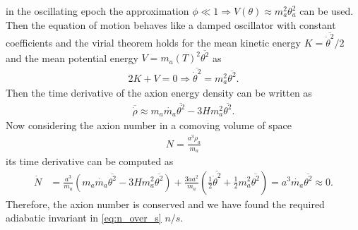 \documentclass[twoside,a4paper, 12pt]{article}
\numberwithin{equation}{section}
\begin{document}
in the oscillating epoch the approximation $\phi \ll 1 \Rightarrow V(\theta) \approx m_a^2 \theta_a^2$ can be used.
Then the equation of motion behaves like a damped oscillator with constant coefficients and the
virial theorem holds for the mean kinetic energy $K = \overline{\dot{\theta}^2} / 2$ and the mean potential energy $V = m_a(T)^2 \overline{\theta^2}$ as
\begin{align*}
    2K + V = 0 \Rightarrow \overline{\dot{\theta}^2} = m_a^2 \overline{\theta^2}.
\end{align*}
Then the time derivative of the axion energy density can be written as
\begin{align*}
    \overline{\dot{\rho}} \approx m_a \dot{m_a} \overline{\theta^2} - 3 H m_a^2 \overline{\theta^2}.
\end{align*}
Now considering the axion number in a comoving volume of space
\begin{align*}
    N = \frac{a^3 \rho_a}{m_a}
\end{align*}
its time derivative can be computed as
\begin{align*}
    \dot{N} &= \frac{a^3}{m_a} (m_a \dot{m_a} \overline{\theta^2} - 3 H m_a^2 \overline{\theta^2}) + \frac{3 \dot{a} a^2}{m_a} \left( \frac{1}{2} \overline{\dot{\theta}^2} + \frac{1}{2} m_a^2 \overline{\theta^2} \right)
    = a^3 \dot{m_a} \overline{\theta^2} \approx 0.
\end{align*}
Therefore, the axion number is conserved
and we have found the required adiabatic invariant in \eqref{eq:n_over_s}
$n/s$.
\end{document}
